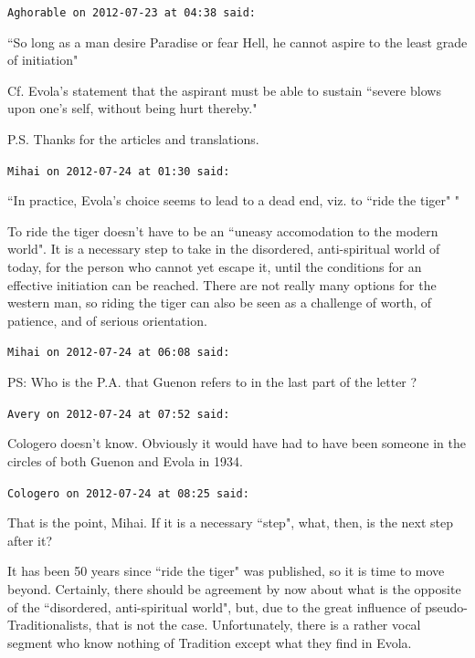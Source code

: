 \begin{footnotesize}\begin{sffamily}



\texttt{Aghorable on 2012-07-23 at 04:38 said: }

``So long as a man desire Paradise or fear Hell, he cannot aspire to the least grade of initiation"

Cf. Evola's statement that the aspirant must be able to sustain ``severe blows upon one's self, without being hurt thereby."

P.S. Thanks for the articles and translations.


\hfill

\texttt{Mihai on 2012-07-24 at 01:30 said: }

``In practice, Evola's choice seems to lead to a dead end, viz. to ``ride the tiger" "

To ride the tiger doesn't have to be an ``uneasy accomodation to the modern world". It is a necessary step to take in the disordered, anti-spiritual world of today, for the person who cannot yet escape it, until the conditions for an effective initiation can be reached. There are not really many options for the western man, so riding the tiger can also be seen as a challenge of worth, of patience, and of serious orientation.


\hfill

\texttt{Mihai on 2012-07-24 at 06:08 said: }

PS: Who is the P.A. that Guenon refers to in the last part of the letter ?


\hfill

\texttt{Avery on 2012-07-24 at 07:52 said: }

Cologero doesn't know. Obviously it would have had to have been someone in the circles of both Guenon and Evola in 1934.


\hfill

\texttt{Cologero on 2012-07-24 at 08:25 said: }

That is the point, Mihai. If it is a necessary ``step", what, then, is the next step after it?

It has been 50 years since ``ride the tiger" was published, so it is time to move beyond. Certainly, there should be agreement by now about what is the opposite of the ``disordered, anti-spiritual world", but, due to the great influence of pseudo-Traditionalists, that is not the case. Unfortunately, there is a rather vocal segment who know nothing of Tradition except what they find in Evola.


\end{sffamily}
\end{footnotesize}
